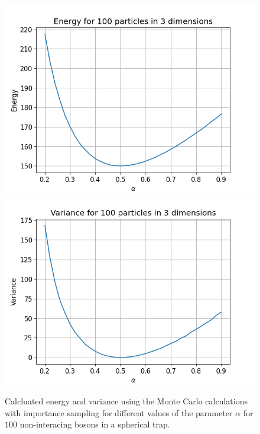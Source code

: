 \documentclass[a4paper, 10pt, english]{revtex4-2} %
\begin{document}
    \begin{figure}[!ht]
        \centering
        \includegraphics[width=\imwidth]{figures/Energy_C_100.png}
        \includegraphics[width=\imwidth]{figures/Varience_C_100.png}
        \caption{Calcluated energy and variance using the Monte Carlo calculations with importance sampling for different values of the parameter $\alpha$ for $100$ non-interacing bosons in a spherical trap.}
        \label{fig: C100}
    \end{figure}
    
\end{document}
